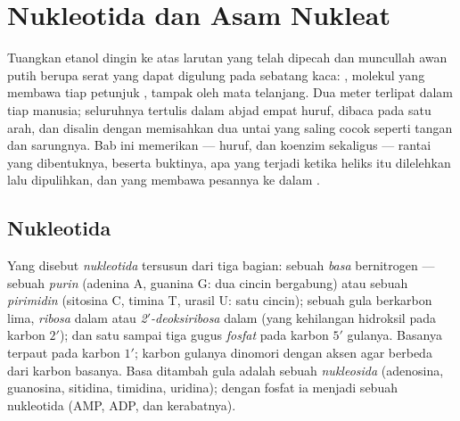 \chapter{Nukleotida dan Asam Nukleat}\label{ch:b1:nucleic-acids}

Tuangkan etanol dingin ke atas larutan  yang telah dipecah dan
muncullah awan putih berupa serat yang dapat digulung pada sebatang
kaca: , molekul yang membawa tiap petunjuk , tampak oleh
mata telanjang. Dua meter  terlipat dalam tiap   manusia;
seluruhnya tertulis dalam abjad empat huruf, dibaca pada satu arah, dan
disalin dengan memisahkan dua untai yang saling cocok seperti tangan dan
sarungnya. Bab ini memerikan  --- huruf,  dan
koenzim sekaligus --- rantai yang dibentuknya,  beserta
buktinya, apa yang terjadi ketika heliks itu dilelehkan lalu dipulihkan,
dan  yang membawa pesannya ke dalam .

\section{Nukleotida}

\begin{definition}[Nukleotida]\label{def:b1:nucleic-acids:nucleotide}
Yang disebut \emph{nukleotida} tersusun dari tiga
bagian: sebuah \emph{basa} bernitrogen --- sebuah
\emph{purin} (adenina A, guanina G: dua cincin bergabung)
atau sebuah \emph{pirimidin} (sitosina C, timina T,
urasil U: satu cincin); sebuah gula berkarbon lima, \emph{ribosa} dalam
 atau \emph{2$'$-deoksiribosa} dalam  (yang kehilangan hidroksil
pada karbon $2'$); dan satu sampai tiga gugus \emph{fosfat} pada karbon
$5'$ gulanya. Basanya terpaut pada karbon $1'$; karbon gulanya
dinomori dengan aksen agar berbeda dari karbon basanya. Basa ditambah
gula adalah sebuah \emph{nukleosida} (adenosina, guanosina, sitidina,
timidina, uridina); dengan fosfat ia menjadi sebuah nukleotida (AMP,
ADP,  dan kerabatnya).
\end{definition}

